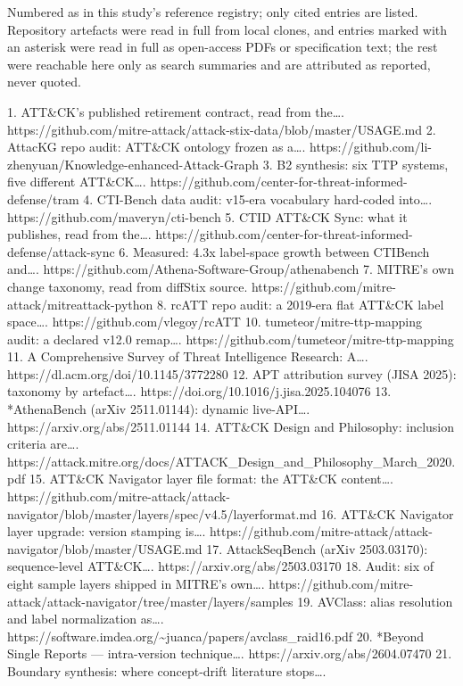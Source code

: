 \documentclass[11pt,a4paper]{article}
\begin{document}
Numbered as in this study's reference registry; only cited entries are listed.
Repository artefacts were read in full from local clones, and entries marked
with an asterisk were read in full as open-access PDFs or specification text;
the rest were reachable here only as search summaries and are attributed as
reported, never quoted.

1. ATT\&CK's published retirement contract, read from the…. https://github.com/mitre-attack/attack-stix-data/blob/master/USAGE.md
2. AttacKG repo audit: ATT\&CK ontology frozen as a…. https://github.com/li-zhenyuan/Knowledge-enhanced-Attack-Graph
3. B2 synthesis: six TTP systems, five different ATT\&CK…. https://github.com/center-for-threat-informed-defense/tram
4. CTI-Bench data audit: v15-era vocabulary hard-coded into…. https://github.com/maveryn/cti-bench
5. CTID ATT\&CK Sync: what it publishes, read from the…. https://github.com/center-for-threat-informed-defense/attack-sync
6. Measured: 4.3x label-space growth between CTIBench and…. https://github.com/Athena-Software-Group/athenabench
7. MITRE's own change taxonomy, read from diffStix source. https://github.com/mitre-attack/mitreattack-python
8. rcATT repo audit: a 2019-era flat ATT\&CK label space…. https://github.com/vlegoy/rcATT
10. tumeteor/mitre-ttp-mapping audit: a declared v12.0 remap…. https://github.com/tumeteor/mitre-ttp-mapping
11. A Comprehensive Survey of Threat Intelligence Research: A…. https://dl.acm.org/doi/10.1145/3772280
12. APT attribution survey (JISA 2025): taxonomy by artefact…. https://doi.org/10.1016/j.jisa.2025.104076
13. *AthenaBench (arXiv 2511.01144): dynamic live-API…. https://arxiv.org/abs/2511.01144
14. ATT\&CK Design and Philosophy: inclusion criteria are…. https://attack.mitre.org/docs/ATTACK\_Design\_and\_Philosophy\_March\_2020.pdf
15. ATT\&CK Navigator layer file format: the ATT\&CK content…. https://github.com/mitre-attack/attack-navigator/blob/master/layers/spec/v4.5/layerformat.md
16. ATT\&CK Navigator layer upgrade: version stamping is…. https://github.com/mitre-attack/attack-navigator/blob/master/USAGE.md
17. AttackSeqBench (arXiv 2503.03170): sequence-level ATT\&CK…. https://arxiv.org/abs/2503.03170
18. Audit: six of eight sample layers shipped in MITRE's own…. https://github.com/mitre-attack/attack-navigator/tree/master/layers/samples
19. AVClass: alias resolution and label normalization as…. https://software.imdea.org/\textasciitilde{}juanca/papers/avclass\_raid16.pdf
20. *Beyond Single Reports — intra-version technique…. https://arxiv.org/abs/2604.07470
21. Boundary synthesis: where concept-drift literature stops….
\end{document}
